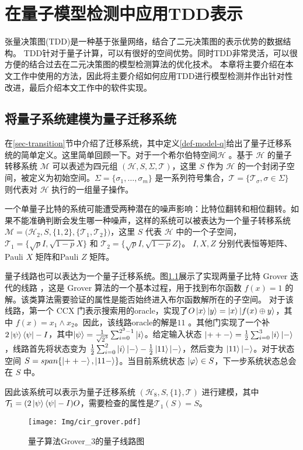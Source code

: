 \chapter{在量子模型检测中应用TDD表示}

张量决策图(TDD)是一种基于张量网络，结合了二元决策图的表示优势的数据结构。
TDD针对于量子计算，可以有很好的空间优势。同时TDD非常灵活，可以很方便的结合过去在二元决策图的模型检测算法的优化技术。
本章将主要介绍在本文工作中使用的方法，因此将主要介绍如何应用TDD进行模型检测并作出针对性改进，最后介绍本文工作中的软件实现。

\section{将量子系统建模为量子迁移系统}

在\ref{sec-transition}节中介绍了迁移系统，其中定义\ref{def-model-q}给出了量子迁移系统的简单定义。这里简单回顾一下。对于一个希尔伯特空间$\mathcal{H}$ 。基于 $\mathcal{H}$ 的量子转移系统 $\mathcal{M}$ 可以表述为四元组 $(\mathcal{H}, S, \Sigma, \mathcal{T})$，这里 $S$ 作为 $\mathcal{H}$ 的一个封闭子空间，被定义为初始空间。$\Sigma=\{\sigma_1,\ldots,\sigma_m\}$ 是一系列符号集合，$\mathcal{T}=\{\mathcal{T}_\sigma, \sigma \in \Sigma\}$ 则代表对 $\mathcal{H}$ 执行的一组量子操作。


\begin{example}
    一个单量子比特的系统可能遭受两种潜在的噪声影响：比特位翻转和相位翻转。如果不能准确判断会发生哪一种噪声，这样的系统可以被表达为一个量子转移系统 $\mathcal{M}=\big(\mathcal{H}_2,S,\{1,2\},\{\mathcal{T}_1,\mathcal{T}_2\} \big)$，这里 $S$ 代表 $\mathcal{H}$ 中的一个子空间，$\mathcal{T}_1=\{\sqrt{p}I, \sqrt{1-p}X\}$ 和 $\mathcal{T}_2=\{\sqrt{p}I, \sqrt{1-p}Z\}$。 $I,X,Z$ 分别代表恒等矩阵、Pauli $X$ 矩阵和Pauli $Z$ 矩阵。
\end{example}
\begin{example}
    \label{ex-image-grover}
    量子线路也可以表达为一个量子迁移系统。图\ref{fig:grover}展示了实现两量子比特 Grover 迭代的线路 \citep{Grover_1996}，这是 Grover 算法的一个基本过程，用于找到布尔函数 $f(x)=1$ 的解。该类算法需要验证的属性是能否始终进入布尔函数解所在的子空间。
    对于该线路，第一个 CCX 门表示搜索用的oracle，实现了$ O\ket{x}\ket{y}=\ket{x}\ket{f(x)\oplus y}$，其中 $f(x)=x_1 \wedge x_2$。因此，该线路oracle的解是\(11\) 。其他门实现了一个补$2\ket{\psi}\bra{\psi}-I$，其中$\ket{\psi}=\frac{1}{\sqrt{2}^{3}}\sum_{i=0}^{2^3-1}\ket{i}$。给定输入状态 $\ket{++-}=\frac{1}{2}\sum_{i=0}^3\ket{i}\ket{-}$，线路首先将状态变为 $\frac{1}{2}\sum_{i=0}^2 \ket{i}\ket{-}-\frac{1}{2}\ket{11}\ket{-}$，然后变为 $\ket{11}\ket{-}$。对于状态空间 $S=span\{\ket{++-},\ket{11-}\}$。当目前系统状态 $\ket{\varphi} \in S$，下一步系统状态总会在 $S$ 中。

    因此该系统可以表示为量子迁移系统 $(\mathcal{H}_8, S, \{1\}, \mathcal{T})$ 进行建模，其中 $\mathcal{T}_1 = {(2\ket{\psi}\bra{\psi}-I) O}$，需要检查的属性是$\mathcal{T}_1(S)=S$。
    \begin{figure}[!htbp]
        \centering
        \texttt{[image: Img/cir\_grover.pdf]}
        \caption{量子算法Grover\_3的量子线路图}
        \label{fig:grover}
    \end{figure} 
\end{example}
